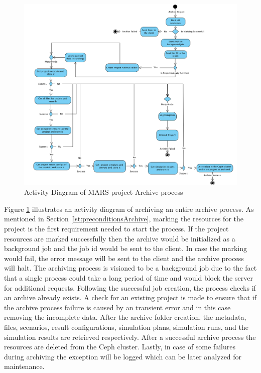 \begin{figure}[H]
    \centering \includegraphics[scale=0.45]{grafiken/archiveActivity.png}
    \caption{Activity Diagram of MARS project Archive process}
    \label{fig:archiveActivity}
\end{figure}

Figure \ref{fig:archiveActivity} illustrates an activity diagram of archiving an entire archive process. As mentioned in Section \ref{lst:preconditionsArchive},
marking the resources for the project is the first requirement needed to start the process. If the project resources are marked successfully
then the archive would be initialized as a background job and the job id would be sent to the client. In case the marking would fail, the error message will be 
sent to the client and the archive process will halt. The archiving process is visioned to be a background job due to the fact that a single process could take
a long period of time and would block the server for additional requests. Following the successful job creation, the process checks if an archive already
exists. A check for an existing project is made to ensure that if the archive process failure is caused by an transient error and in this case removing the incomplete data. After
the archive folder creation, the metadata, files, scenarios, result configurations, simulation plans, simulation runs, and the simulation results are retrieved respectively.
After a successful archive process the  resources are deleted from the Ceph cluster. Lastly, in case of some failures during archiving the exception will be logged 
which can be later analyzed for maintenance.

